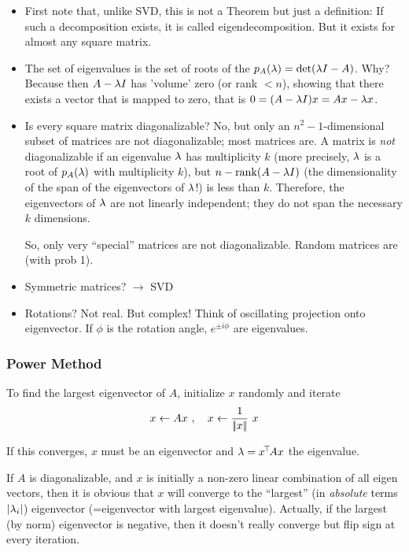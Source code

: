 \begin{itemize}
\item First note that, unlike SVD, this is not a Theorem but just a definition: If such a decomposition exists, it is called eigendecomposition. But it exists for almost any square matrix.
  
\item The set of eigenvalues is the set of roots of the
   $p_A(\lambda) = \det(\lambda I - A)$. Why?
  Because then $A-\lambda I$ has 'volume' zero (or rank $<n$), showing that
  there exists a vector that is mapped to zero, that is $0=(A-\lambda
  I)x=Ax-\lambda x$.

\item Is every square matrix diagonalizable? No, but only an
$n^2-1$-dimensional subset of matrices are not diagonalizable; most
matrices are. A matrix is \emph{not} diagonalizable if an eigenvalue
$\lambda$ has multiplicity $k$ (more precisely, $\lambda$ is a root of $p_A(\lambda)$
with multiplicity $k$), but $n-{\rm rank}(A-\lambda I)$ (the dimensionality of
the span of the eigenvectors of $\lambda$!) is less than $k$. Therefore,
the eigenvectors of $\lambda$ are not linearly independent; they do not
span the necessary $k$ dimensions.

So, only very ``special'' matrices are not diagonalizable. Random
matrices are (with prob 1).

\item Symmetric matrices? $\to$ SVD

\item Rotations? Not real. But complex! Think of oscillating
projection onto eigenvector. If $\phi$ is the rotation angle, $e^{\pm
i\phi}$ are eigenvalues.
\end{itemize}

\subsubsection{Power Method}

To find the largest eigenvector of $A$, initialize $x$ randomly and iterate
\begin{equation}
x \gets A x~,\quad 
x \gets \frac{1}{|\!|x|\!|}~ x
\end{equation}
\begin{items}
\item If this converges, $x$ must be an eigenvector and $\lambda=x^{\!\top\!} A x$
the eigenvalue.
\item If $A$ is diagonalizable, and $x$ is initially a non-zero linear
combination of all eigen vectors, then it is obvious that $x$ will
converge to the ``largest'' (in \emph{absolute} terms $|\lambda_i|$)
eigenvector (=eigenvector with largest eigenvalue). Actually, if the
largest (by norm) eigenvector is negative, then it doesn't really
converge but flip sign at every iteration.
\end{items}

